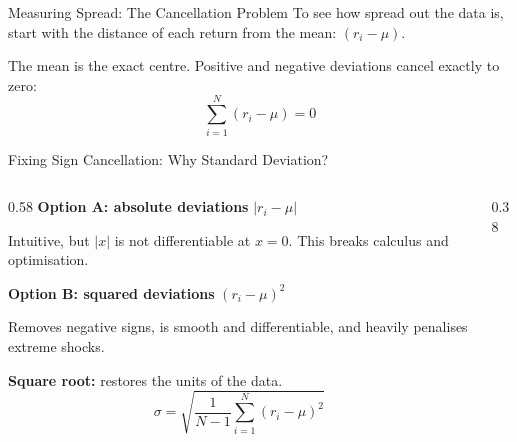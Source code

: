 \documentclass[aspectratio=169,11pt]{beamer}
\begin{document}
\begin{frame}{Measuring Spread: The Cancellation Problem}
  To see how spread out the data is, start with the distance of each return from the mean: $(r_i - \mu)$.
  \bigskip

  The mean is the exact centre. Positive and negative deviations \alert{cancel exactly to zero}:
  \[
    \sum_{i=1}^{N} (r_i - \mu) = 0
  \]
\end{frame}

\begin{frame}{Fixing Sign Cancellation: Why Standard Deviation?}
  \begin{columns}[T]
    \begin{column}{0.58\textwidth}
      \small
      \textbf{Option A: absolute deviations} $|r_i - \mu|$

      Intuitive, but $|x|$ is not differentiable at $x=0$. This breaks calculus and optimisation.
      \medskip

      \textbf{Option B: squared deviations} $(r_i - \mu)^2$

      Removes negative signs, is smooth and differentiable, and heavily penalises extreme shocks.
      \medskip

      \textbf{Square root:} restores the units of the data.
      \[
        \sigma = \sqrt{\frac{1}{N-1} \sum_{i=1}^{N} (r_i - \mu)^2}
      \]
    \end{column}
    \begin{column}{0.38\textwidth}
      \centering
    \end{column}
  \end{columns}
\end{frame}
\end{document}
